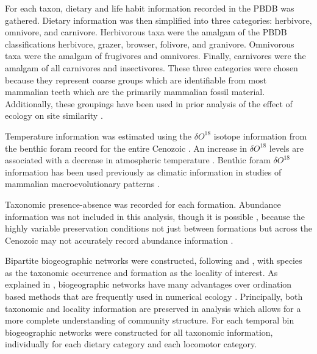 \documentclass[12pt,letterpaper]{article}
\begin{document}
For each taxon, dietary and life habit information recorded in the PBDB was gathered. Dietary information was then simplified into three categories: herbivore, omnivore, and carnivore. Herbivorous taxa were the amalgam of the PBDB classifications herbivore, grazer, browser, folivore, and granivore. Omnivorous taxa were the amalgam of frugivores and omnivores. Finally, carnivores were the amalgam of all carnivores and insectivores. These three categories were chosen because they represent coarse groups which are identifiable from most mammalian teeth which are the primarily mammalian fossil material. Additionally, these groupings have been used in prior analysis of the effect of ecology on site similarity \citep{Jernvall2004}.

Temperature information was estimated using the \(\delta O^{18}\) isotope information from the benthic foram record for the entire Cenozoic \citep{Zachos2008}. An increase in \(\delta O^{18}\) levels are associated with a decrease in atmospheric temperature \citep{Zachos2001,Zachos2008}. Benthic foram \(\delta O^{18}\) information has been used previously as climatic information in studies of mammalian macroevolutionary patterns \citep{Alroy2000g,Figueirido2012,Rose2011}.
%
%

Taxonomic presence-absence was recorded for each formation. Abundance information was not included in this analysis, though it is possible \citep{Sidor2013}, because the highly variable preservation conditions not just between formations but across the Cenozoic may not accurately record abundance information \citep{Damuth1982}.

%

Bipartite biogeographic networks were constructed, following \citet{Sidor2013} and \citet{Vilhena2013}, with species as the taxonomic occurrence and formation as the locality of interest. As explained in \citet{Sidor2013}, biogeographic networks have many advantages over ordination based methods that are frequently used in numerical ecology \citep{Legendre2012}. Principally, both taxonomic and locality information are preserved in analysis which allows for a more complete understanding of community structure. For each temporal bin biogeographic networks were constructed for all taxonomic information, individually for each dietary category and each locomotor category.
\end{document}
